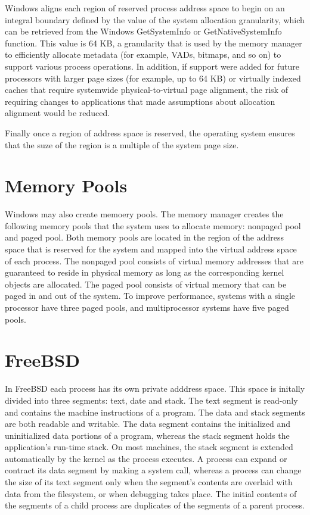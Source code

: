 \documentclass[letterpaper,10pt,draftclsnofoot,onecolumn]{IEEEtran}
\begin{document}
Windows aligns each region of reserved process address space to begin on an integral boundary
defined by the value of the system allocation granularity, which can be retrieved from the Windows GetSystemInfo or GetNativeSystemInfo function. This value is 64 KB, a granularity that is used by the memory manager to efficiently allocate metadata (for example, VADs, bitmaps, and so on) to support various process operations. In addition, if support were added for future processors with larger page sizes (for example, up to 64 KB) or virtually indexed caches that require systemwide physical-to-virtual page alignment, the risk of requiring changes to applications that made assumptions about allocation alignment would be reduced.\cite{[1]}

Finally once a region of address space is reserved, the operating system ensures that the suze of the region is a multiple of the system page size.

\section*{Memory Pools}
Windows may also create memoery pools. The memory manager creates the following memory pools that the system uses to allocate memory: nonpaged pool and paged pool. Both memory pools are located in the region of the address space that is reserved for the system and mapped into the virtual address space of each process. The nonpaged pool consists of virtual memory addresses that are guaranteed to reside in physical memory as long as the corresponding kernel objects are allocated. The paged pool consists of virtual memory that can be paged in and out of the system. To improve performance, systems with a single processor have three paged pools, and multiprocessor systems have five paged pools.  

%
%

\section*{FreeBSD}

In FreeBSD each process has its own private adddress space. This space is initally divided into three segments: text, date and stack. The text segment is read-only and contains the machine instructions of a program. The data and stack segments are both readable and writable. The data segment contains the initialized and uninitialized data portions of a program, whereas the stack segment holds the application's run-time stack. On most machines, the stack segment is extended automatically by the kernel as the process executes. A process can expand or contract its data segment by making a system call, whereas a process can change the size of its text segment only when the segment's contents are overlaid with data from the filesystem, or when debugging takes place. The initial contents of the segments of a child process are duplicates of the segments of a parent process.
\end{document}
